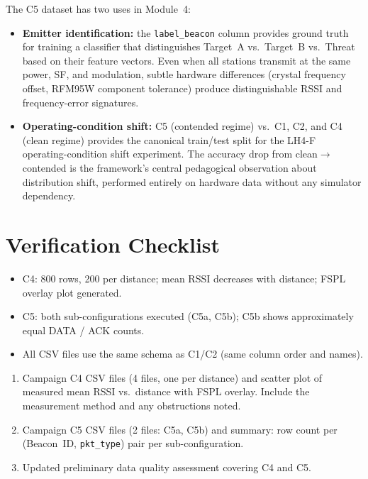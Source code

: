 \documentclass[11pt,letterpaper]{article}
\begin{document}
\begin{tcolorbox}[infobox={What C5 Teaches Module~4}]
	The C5 dataset has two uses in Module~4:
	\begin{itemize}[leftmargin=1.2em]
		\item \textbf{Emitter identification:} the \texttt{label\_beacon} column provides ground truth for training a classifier that distinguishes Target~A vs.\ Target~B vs.\ Threat based on their feature vectors. Even when all stations transmit at the same power, SF, and modulation, subtle hardware differences (crystal frequency offset, RFM95W component tolerance) produce distinguishable \mbox{RSSI} and frequency-error signatures.
		\item \textbf{Operating-condition shift:} C5 (contended regime) vs.\ C1, C2, and C4 (clean regime) provides the canonical train/test split for the LH4-F operating-condition shift experiment. The accuracy drop from clean$\to$contended is the framework's central pedagogical observation about distribution shift, performed entirely on hardware data without any simulator dependency.
	\end{itemize}
\end{tcolorbox}

\section{Verification Checklist}
\begin{itemize}[leftmargin=2em]
	\item[$\square$] C4: 800 rows, 200 per distance; mean \mbox{RSSI} decreases with distance; \mbox{FSPL} overlay plot generated.
	\item[$\square$] C5: both sub-configurations executed (C5a, C5b); C5b shows approximately equal DATA / ACK counts.
	\item[$\square$] All CSV files use the same schema as C1/C2 (same column order and names).
\end{itemize}

\begin{tcolorbox}[deliverable={Lab Handout 3-G Deliverable}]
	\begin{enumerate}[leftmargin=1.2em]
		\item Campaign C4 CSV files (4 files, one per distance) and scatter plot of measured mean \mbox{RSSI} vs.\ distance with \mbox{FSPL} overlay. Include the measurement method and any obstructions noted.
		\item Campaign C5 CSV files (2 files: C5a, C5b) and summary: row count per (Beacon~\mbox{ID}, \texttt{pkt\_type}) pair per sub-configuration.
		\item Updated preliminary data quality assessment covering C4 and C5.
	\end{enumerate}
\end{tcolorbox}

\printhandoutglossary
\end{document}
